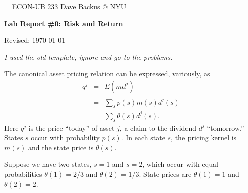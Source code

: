\documentclass[11pt]{exam}
\begin{document}
\parskip=\bigskipamount
\parindent=0.0in
\thispagestyle{empty}
{\large ECON-UB 233 \hfill Dave Backus @ NYU}

\bigskip\bigskip
\centerline{\Large \bf Lab Report \#0:  Risk and Return}
\centerline{Revised: \today}

\bigskip
{\it I used the old template, ignore and go to the problems.}

\begin{questions}
The canonical asset pricing relation can be expressed, variously, as
\begin{eqnarray*}
    q^j &=& E ( m d^j)  \phantom{\sum_s} \\
        &=& \sum_s p(s) m(s) d^j(s)\\
        &=& \sum_s \theta(s) d^j(s) .
\end{eqnarray*}
Here $q^j$ is the price ``today'' of asset $j$, a claim to the dividend $d^j$ ``tomorrow.''
States $s$ occur with probability $p(s)$.
In each state $s$, the pricing kernel is $m(s)$
and the state price is $\theta(s)$.

Suppose we have two states, $s=1$ and $s=2$,
which occur with equal probabilities $\theta(1) = 2/3$ and $\theta(2) = 1/3$.
State prices are $\theta(1) = 1$ and $\theta(2) = 2$.
\end{questions}
\end{document}
